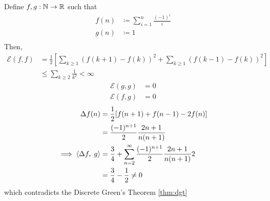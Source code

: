\documentclass[main]{subfiles}
\begin{document}
Define $f,g:\mathbb N \to \mathbb R$ such that
\begin{align*}
    f(n) & \coloneqq \sum_{i=1}^n\frac{(-1)^i}{i} \\
    g(n) & \coloneqq 1                            \\
\end{align*}
Then,
\begin{align*}
    \mathcal{E}(f,f) & = \frac{1}{2}\left[\sum_{k\geq 1}(f(k+1)-f(k))^2 + \sum_{k\geq 1}(f(k-1)-f(k))^2\right] \\
                     & \leq \sum_{k\geq2}\frac{1}{k^2} < \infty
\end{align*}
\begin{align*}
    \mathcal{E}(g,g) & = 0 \\
    \mathcal{E}(f,g) & = 0
\end{align*}
\begin{align*}
    \Delta f(n)               & = \frac{1}{2}[f(n+1) + f(n-1) - 2f(n)]                                     \\
                              & = \frac{(-1)^{n+1}}{2}\frac{2n+1}{n(n+1)}                                  \\
    \implies \left\langle\Delta f,\;g\right\rangle & = \frac{3}{4} + \sum_{n=2}^\infty \frac{(-1)^{n+1}}{2}\frac{2n+1}{n(n+1)}2 \\
                              & = \frac{3}{4} - \frac{1}{2} \neq 0                                         \\
\end{align*}
which contradicts the Discrete Green's Theorem \eqref{thm:dgt}
\end{document}
